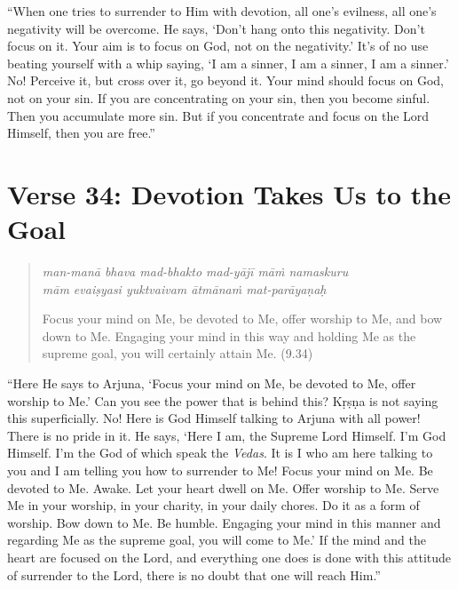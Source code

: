 \documentclass[12pt, twoside, openright]{memoir}
\begin{document}
\enquote{When one tries to surrender to Him with devotion, all one’s evilness, all one’s negativity will be overcome. He says, \enquote{Don’t hang onto this negativity. Don’t focus on it. Your aim is to focus on God, not on the negativity.} It’s of no use beating yourself with a whip saying, \enquote{I am a sinner, I am a sinner, I am a sinner.} No! Perceive it, but cross over it, go beyond it. Your mind should focus on God, not on your sin. If you are concentrating on your sin, then you become sinful. Then you accumulate more sin. But if you concentrate and focus on the Lord Himself, then you are free.}



\section{Verse 34: Devotion Takes Us to the Goal}\label{sec-verse-34-devotion-takes-us-to-the-goal}




\par
\begin{verse}
\textit{man-manā bhava mad-bhakto mad-yājī māṁ namaskuru} \\
\textit{mām evaiṣyasi yuktvaivam ātmānaṁ mat-parāyaṇaḥ}

\noindent Focus your mind on Me, be devoted to Me, offer worship to Me, and bow down to Me. Engaging your mind in this way and holding Me as the supreme goal, you will certainly attain Me. (9.34)
\end{verse}
\par


\enquote{Here He says to Arjuna, \enquote{Focus your mind on Me, be devoted to Me, offer worship to Me.} Can you see the power that is behind this? Kṛṣṇa is not saying this superficially. No! Here is God Himself talking to Arjuna with all power! There is no pride in it. He says, \enquote{Here I am, the Supreme Lord Himself. I’m God Himself. I’m the God of which speak the \textit{Vedas}. It is I who am here talking to you and I am telling you how to surrender to Me! Focus your mind on Me. Be devoted to Me. Awake. Let your heart dwell on Me. Offer worship to Me. Serve Me in your worship, in your charity, in your daily chores. Do it as a form of worship. Bow down to Me. Be humble. Engaging your mind in this manner and regarding Me as the supreme goal, you will come to Me.} If the mind and the heart are focused on the Lord, and everything one does is done with this attitude of surrender to the Lord, there is no doubt that one will reach Him.}
\end{document}
